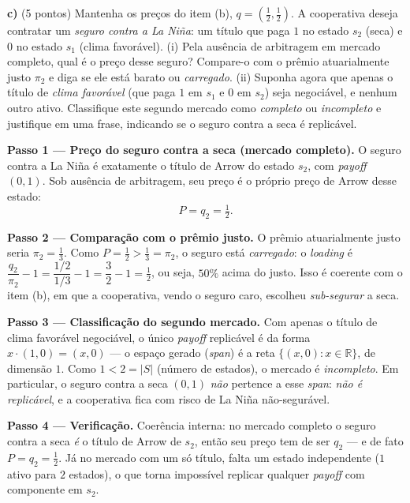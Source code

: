 \textbf{c)} (5 pontos) Mantenha os preços do item (b), $q=\left(\tfrac12,\tfrac12\right)$. A cooperativa deseja contratar um \emph{seguro contra a La Niña}: um título que paga $1$ no estado $s_2$ (seca) e $0$ no estado $s_1$ (clima favorável). (i) Pela ausência de arbitragem em mercado completo, qual é o preço desse seguro? Compare-o com o prêmio atuarialmente justo $\pi_2$ e diga se ele está barato ou \emph{carregado}. (ii) Suponha agora que apenas o título de \emph{clima favorável} (que paga $1$ em $s_1$ e $0$ em $s_2$) seja negociável, e nenhum outro ativo. Classifique este segundo mercado como \emph{completo} ou \emph{incompleto} e justifique em uma frase, indicando se o seguro contra a seca é replicável.
\resolucaobox{7.2cm}
\begin{solucao}
\textbf{Passo 1 --- Preço do seguro contra a seca (mercado completo).} O seguro contra a La Niña é exatamente o título de Arrow do estado $s_2$, com \emph{payoff} $(0,1)$. Sob ausência de arbitragem, seu preço é o próprio preço de Arrow desse estado:
\[ P=q_2=\tfrac12. \]

\textbf{Passo 2 --- Comparação com o prêmio justo.} O prêmio atuarialmente justo seria $\pi_2=\tfrac13$. Como $P=\tfrac12>\tfrac13=\pi_2$, o seguro está \emph{carregado}: o \emph{loading} é $\dfrac{q_2}{\pi_2}-1=\dfrac{1/2}{1/3}-1=\dfrac32-1=\tfrac12$, ou seja, $50\%$ acima do justo. Isso é coerente com o item (b), em que a cooperativa, vendo o seguro caro, escolheu \emph{sub-segurar} a seca.

\textbf{Passo 3 --- Classificação do segundo mercado.} Com apenas o título de clima favorável negociável, o único \emph{payoff} replicável é da forma $x\cdot(1,0)=(x,0)$ --- o espaço gerado (\emph{span}) é a reta $\{(x,0):x\in\mathbb{R}\}$, de dimensão $1$. Como $1<2=|S|$ (número de estados), o mercado é \emph{incompleto}. Em particular, o seguro contra a seca $(0,1)$ \emph{não} pertence a esse \emph{span}: \emph{não é replicável}, e a cooperativa fica com risco de La Niña não-segurável.

\textbf{Passo 4 --- Verificação.} Coerência interna: no mercado completo o seguro contra a seca \emph{é} o título de Arrow de $s_2$, então seu preço tem de ser $q_2$ --- e de fato $P=q_2=\tfrac12$. Já no mercado com um só título, falta um estado independente ($1$ ativo para $2$ estados), o que torna impossível replicar qualquer \emph{payoff} com componente em $s_2$.


\end{solucao}
